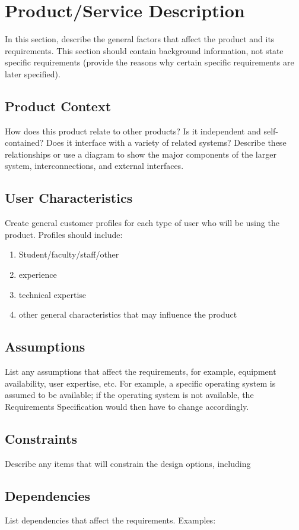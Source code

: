 \section{Product/Service Description}
In this section, describe the general factors that affect the product and its requirements. This section should contain background information, not state specific requirements (provide the reasons why certain specific requirements are later specified).

\subsection{Product Context}
How does this product relate to other products? Is it independent and self-contained?  Does it interface with a variety of related systems?  Describe these relationships or use a diagram to show the major components of the larger system, interconnections, and external interfaces.

\subsection{User Characteristics}
Create general customer profiles for each type of user who will be using the product. Profiles should include:

\begin{enumerate}
    \item{Student/faculty/staff/other}
    \item{experience}
    \item{technical expertise}
    \item{other general characteristics that may influence the product}
\end{enumerate}

\subsection{Assumptions}
List any assumptions that affect the requirements, for example, equipment availability, user expertise, etc.  For example, a specific operating system is assumed to be available; if  the operating system is not available, the Requirements Specification would then have to change accordingly.

\subsection{Constraints}
Describe any items that will constrain the design options, including

\subsection{Dependencies}
List dependencies that affect the requirements.  Examples: